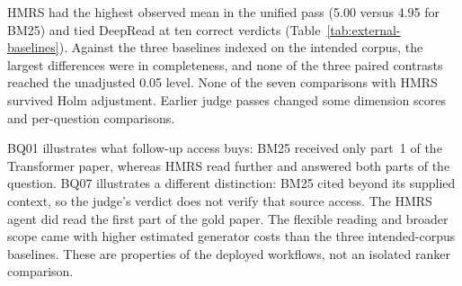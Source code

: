 \begin{table}[!tb]
\centering
\caption{Blind answer scores for the eight configurations in the native
deployment case study on BQ01--BQ10. Each configuration answered each
question once. C/P/I denotes
correct, partial and incorrect verdict counts. Time and cost are per
question; time is end-to-end and cost is estimated for generator calls
only. $\dagger$ Gold-paper subset; $\ddagger$ DeepRead's native corpus.
$^{a}$ Configured for five collections, but in nine of ten questions
at least one search lacked an effective restriction. The audit reported 31
distinct collection-ID values in the result lists
(Section~\ref{sec:exp-e2}). The configurations differ in source access,
and their indexed corpora are not all matched.}
\label{tab:external-baselines}
\end{table}

HMRS had the highest observed mean in the unified pass (5.00 versus
4.95 for BM25) and tied DeepRead at ten correct verdicts
(Table~\ref{tab:external-baselines}). Against the three baselines indexed
on the intended corpus, the largest differences were in completeness,
and none of the three paired contrasts reached the unadjusted 0.05 level.
None of the seven comparisons with HMRS survived Holm adjustment. Earlier
judge passes changed some dimension scores and per-question comparisons.

BQ01 illustrates what follow-up access buys: BM25 received only part~1
of the Transformer paper, whereas HMRS read further and answered both
parts of the question. BQ07 illustrates a different distinction: BM25
cited beyond its supplied context, so the judge's verdict does not verify
that source access. The HMRS agent did read the first part of the gold
paper. The flexible reading and broader scope came with higher estimated
generator costs than the three intended-corpus baselines. These are
properties of the deployed workflows, not an isolated ranker comparison.
